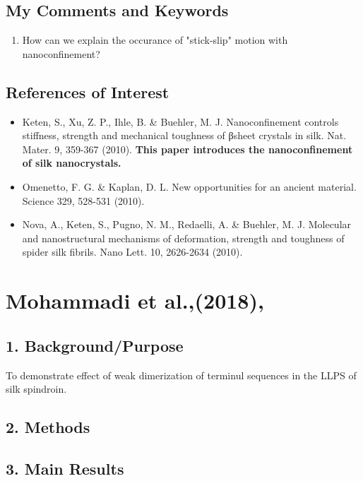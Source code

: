 \documentclass{ltjsarticle}
\numberwithin{equation}{subsection}
\begin{document}
\subsection{My Comments and Keywords}
\begin{enumerate}
    \item How can we explain the occurance of "stick-slip" motion with nanoconfinement?
\end{enumerate}
\subsection{References of Interest}
\begin{itemize}
    \item Keten, S., Xu, Z. P., Ihle, B. \& Buehler, M. J. Nanoconfinement controls stiffness, strength and mechanical toughness of βsheet crystals in silk. Nat. Mater. 9, 359-367 (2010).  \textbf{This paper introduces the nanoconfinement of silk nanocrystals.}
    \item Omenetto, F. G. \& Kaplan, D. L. New opportunities for an ancient material. Science 329, 528-531 (2010).
    \item Nova, A., Keten, S., Pugno, N. M., Redaelli, A. \& Buehler, M. J. Molecular and nanostructural mechanisms of deformation, strength and toughness of spider silk fibrils. Nano Lett. 10, 2626-2634 (2010).
\end{itemize}

\newpage
\section{Mohammadi et al.,(2018),\cite{mohammadi}}

\subsection{1. Background/Purpose}
To demonstrate effect of weak dimerization of terminul sequences in the LLPS of silk spindroin.
\subsection{2. Methods}

\subsection{3. Main Results}
\end{document}
